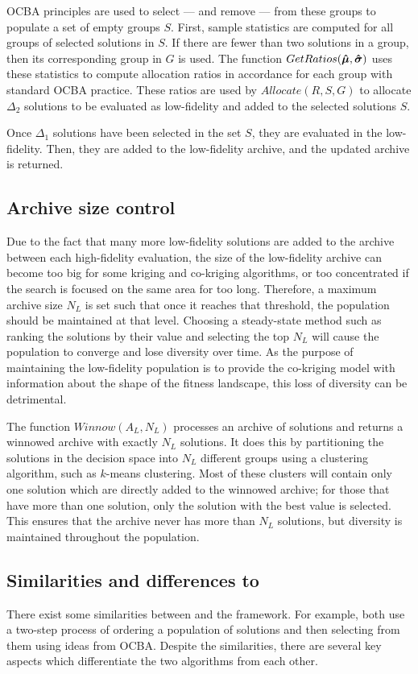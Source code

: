 OCBA principles are used to select --- and remove --- from these groups to populate a set of empty groups $S$. First, sample statistics are computed for all groups of selected solutions in $S$. If there are fewer than two solutions in a group, then its corresponding group in $G$ is used. The function $GetRatios(\boldsymbol{\hat{\mu}},\boldsymbol{\hat{\sigma}})$ uses these statistics to compute allocation ratios in accordance for each group with standard OCBA practice. These ratios are used by $Allocate(R,S,G)$ to allocate $\Delta_2$ solutions to be evaluated as low-fidelity and added to the selected solutions $S$.

Once $\Delta_1$ solutions have been selected in the set $S$, they are evaluated in the low-fidelity. Then, they are added to the low-fidelity archive, and the updated archive is returned.

\subsection{Archive size control}
Due to the fact that many more low-fidelity solutions are added to the archive between each high-fidelity evaluation, the size of the low-fidelity archive can become too big for some kriging and co-kriging algorithms, or too concentrated if the search is focused on the same area for too long. Therefore, a maximum archive size $N_L$ is set such that once it reaches that threshold, the population should be maintained at that level. Choosing a steady-state method such as ranking the solutions by their value and selecting the top $N_L$ will cause the population to converge and lose diversity over time. As the purpose of maintaining the low-fidelity population is to provide the co-kriging model with information about the shape of the fitness landscape, this loss of diversity can be detrimental. 

The function $Winnow(A_L,N_L)$ processes an archive of solutions and returns a winnowed archive with exactly $N_L$ solutions. It does this by partitioning the solutions in the decision space into $N_L$ different groups using a clustering algorithm, such as $k$-means clustering. Most of these clusters will contain only one solution which are directly added to the winnowed archive; for those that have more than one solution, only the solution with the best value is selected. This ensures that the archive never has more than $N_L$ solutions, but diversity is maintained throughout the population.

\subsection{Similarities and differences to \motos{}}
There exist some similarities between \AlgName{} and the \motos{} framework. For example, both use a two-step process of ordering a population of solutions and then selecting from them using ideas from OCBA. Despite the similarities, there are several key aspects which differentiate the two algorithms from each other. 

